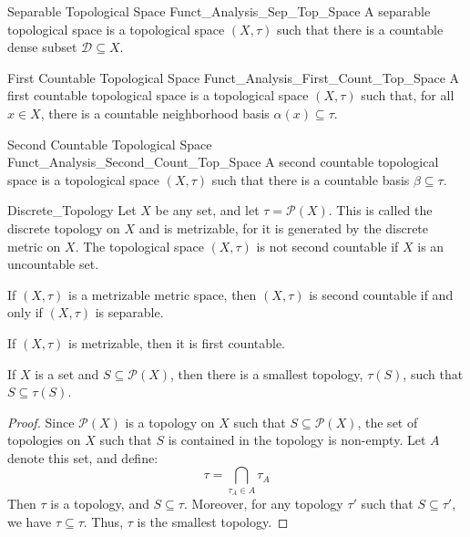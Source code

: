         \begin{ldefinition}{Separable Topological Space}
              {Funct_Analysis_Sep_Top_Space}
            A separable topological space is a topological
            space $(X,\tau)$ such that there is a countable
            dense subset $\mathcal{D}\subseteq{X}$.
        \end{ldefinition}
        \begin{ldefinition}{First Countable Topological Space}
              {Funct_Analysis_First_Count_Top_Space}
            A first countable topological space is a
            topological space $(X,\tau)$ such that, for
            all $x\in{X}$, there is a countable neighborhood
            basis $\alpha(x)\subseteq\tau$.
        \end{ldefinition}
        \begin{ldefinition}{Second Countable Topological Space}
              {Funct_Analysis_Second_Count_Top_Space}
            A second countable topological space is a
            topological space $(X,\tau)$ such that there is
            a countable basis $\beta\subseteq\tau$.
        \end{ldefinition}
        \begin{lexample}{}{Discrete_Topology}
            Let $X$ be any set, and let $\tau=\mathcal{P}(X)$.
            This is called the discrete topology on $X$
            and is metrizable, for it is generated by the
            discrete metric on $X$. The topological space
            $(X,\tau)$ is not second countable if $X$ is an
            uncountable set.
        \end{lexample}
        \begin{theorem}
            If $(X,\tau)$ is a metrizable metric space, then
            $(X,\tau)$ is second countable if and only if
            $(X,\tau)$ is separable.
        \end{theorem}
        \begin{theorem}
            If $(X,\tau)$ is metrizable, then it is first
            countable.
        \end{theorem}
        \begin{theorem}
            If $X$ is a set and $S\subseteq\mathcal{P}(X)$,
            then there is a smallest topology, $\tau(S)$, such
            that $S\subseteq\tau(S)$.
        \end{theorem}
        \begin{proof}
            Since $\mathcal{P}(X)$ is a topology on $X$ such
            that $S\subseteq\mathcal{P}(X)$, the set of
            topologies on $X$ such that $S$ is contained in
            the topology is non-empty. Let $A$ denote this set,
            and define:
            \begin{equation}
                \tau=\bigcap_{\tau_{A}\in{A}}\tau_{A}
            \end{equation}
            Then $\tau$ is a topology, and $S\subseteq\tau$.
            Moreover, for any topology $\tau'$ such
            that $S\subseteq\tau'$, we have $\tau\subseteq\tau$.
            Thus, $\tau$ is the smallest topology.
        \end{proof}
